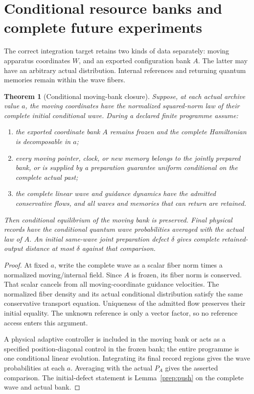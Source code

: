 \documentclass[11pt,oneside,openany]{book}
\newtheorem{theorem}{Theorem}[chapter]
\theoremstyle{definition}
\theoremstyle{remark}\newtheorem{remark}[theorem]{Remark}
\begin{document}
\section{Conditional resource banks and complete future experiments}

The correct integration target retains two kinds of data separately:
moving apparatus coordinates $W$, and an exported configuration bank $A$.
The latter may have an arbitrary actual distribution. Internal references
and returning quantum memories remain within the wave fibers.

\begin{theorem}[Conditional moving-bank closure]\label{prep:bank}
Suppose, at each actual archive value $a$, the moving coordinates have
the normalized squared-norm law of their complete initial conditional wave.
During a declared finite programme assume:
\begin{enumerate}
 \item the exported coordinate bank $A$ remains frozen and the complete
 Hamiltonian is decomposable in $a$;
 \item every moving pointer, clock, or new memory belongs to the jointly
 prepared bank, or is supplied by a preparation guarantee uniform
 conditional on the complete actual past;
 \item the complete linear wave and guidance dynamics have the admitted
 conservative flows, and all waves and memories that can return are retained.
\end{enumerate}
Then conditional equilibrium of the moving bank is preserved. Final
physical records have the conditional quantum wave probabilities averaged
with the actual law of $A$. An initial same-wave joint preparation
defect $\delta$ gives complete retained-output distance at most $\delta$
against that comparison.
\end{theorem}
\begin{proof}
At fixed $a$, write the complete wave as a scalar fiber norm times a
normalized moving/internal field. Since $A$ is frozen, its fiber norm
is conserved. That scalar cancels from all moving-coordinate guidance
velocities. The normalized fiber density and its actual conditional
distribution satisfy the same conservative transport equation.
Uniqueness of the admitted flow preserves their initial equality.
The unknown reference is only a vector factor, so no reference access
enters this argument.

A physical adaptive controller is included in the moving bank or acts as
a specified position-diagonal control in the frozen bank; the entire
programme is one conditional linear evolution. Integrating its final
record regions gives the wave probabilities at each $a$. Averaging with
the actual $P_A$ gives the asserted comparison. The initial-defect statement
is Lemma~\ref{prep:push} on the complete wave and actual bank.
\end{proof}
\end{document}
